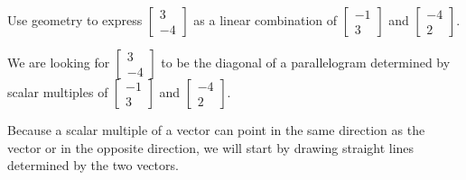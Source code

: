 \documentclass{ximera}
\begin{document}
\begin{example}\label{ex:lincombparallelogrammethod}
Use geometry to express $\begin{bmatrix}3\\-4\end{bmatrix}$ as a linear combination of $\begin{bmatrix}-1\\3\end{bmatrix}$ and $\begin{bmatrix}-4\\2\end{bmatrix}$.


\begin{explanation}
We are looking for $\begin{bmatrix}3\\-4\end{bmatrix}$ to be the diagonal of a parallelogram determined by scalar multiples of $\begin{bmatrix}-1\\3\end{bmatrix}$ and $\begin{bmatrix}-4\\2\end{bmatrix}$.  

\begin{center}
\end{center}

Because a scalar multiple of a vector can point in the same direction as the vector or in the opposite direction, we will start by drawing straight lines determined by the two vectors.


\end{explanation}
\end{example}
\end{document}
